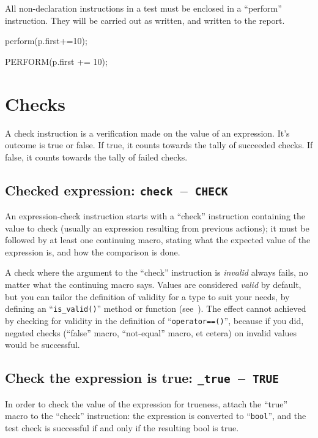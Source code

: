 \documentclass[twoside, a4paper, article]{memoir}
\newcommand*\testudocolor{\color{red!80!blue}}
\newcommand*\testudo[1]{\texttt{\testudocolor{}#1}}
\newcommand*\testudopair[2]{\testudo{#1}~--~\testudo{#2}}
\begin{document}
All non-declaration instructions in a test must be enclosed in a ``perform''
instruction.  They will be carried out as written, and written to the report.
\begin{cpplisting}
perform(p.first+=10);
\end{cpplisting}

\begin{cpplisting}
PERFORM(p.first += 10);
\end{cpplisting}


\section{Checks}
\label{sec:checks}

A check instruction is a verification made on the value of an expression.  It's
outcome is true or false.  If true, it counts towards the tally of succeeded
checks.  If false, it counts towards the tally of failed checks.

\subsection{Checked expression: \testudopair{check}{CHECK}}
\label{sec:checked-expression}

An expression-check instruction starts with a ``check'' instruction containing
the value to check (usually an expression resulting from previous actions); it
must be followed by at least one continuing macro, stating what the expected
value of the expression is, and how the comparison is done.

A check where the argument to the ``check'' instruction is \emph{invalid}
always fails, no matter what the continuing macro says.  Values are considered
\emph{valid} by default, but you can tailor the definition of validity for a
type to suit your needs, by defining an ``\texttt{is\_valid()}'' method or
function (see~).  The effect cannot achieved by checking for
validity in the definition of ``\texttt{operator==()}'', because if you did,
negated checks (``false'' macro, ``not-equal'' macro, et cetera) on invalid
values would be successful.

\subsection{Check the expression is true:
  \testudopair{\_true}{TRUE}}
\label{sec:check-expression-true}

In order to check the value of the expression for trueness, attach the ``true''
macro to the ``check'' instruction: the expression is converted to
``\texttt{bool}'', and the test check is successful if and only if the
resulting bool is true.
\end{document}
